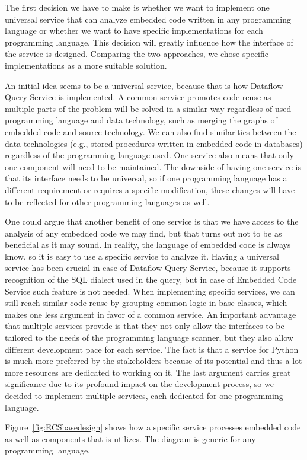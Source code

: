The first decision we have to make is whether we want to implement one universal service that can analyze embedded code written in any programming language or whether we want to have specific implementations for each programming language. This decision will greatly influence how the interface of the service is designed. Comparing the two approaches, we chose specific implementations as a more suitable solution.
\par
An initial idea seems to be a universal service, because that is how Dataflow Query Service is implemented. A common service promotes code reuse as multiple parts of the problem will be solved in a similar way regardless of used programming language and data technology, such as merging the graphs of embedded code and source technology. We can also find similarities between the data technologies (e.g., stored procedures written in embedded code in databases) regardless of the programming language used. One service also means that only one component will need to be maintained. The downside of having one service is that its interface needs to be universal, so if one programming language has a different requirement or requires a specific modification, these changes will have to be reflected for other programming languages as well.
\par
One could argue that another benefit of one service is that we have access to the analysis of any embedded code we may find, but that turns out not to be as beneficial as it may sound. In reality, the language of embedded code is always know, so it is easy to use a specific service to analyze it. Having a universal service has been crucial in case of Dataflow Query Service, because it supports recognition of the SQL dialect used in the query, but in case of Embedded Code Service such feature is not needed. When implementing specific services, we can still reach similar code reuse by grouping common logic in base classes, which makes one less argument in favor of a common service. An important advantage that multiple services provide is that they not only allow the interfaces to be tailored to the needs of the programming language scanner, but they also allow different development pace for each service. The fact is that a service for Python is much more preferred by the stakeholders because of its potential and thus a lot more resources are dedicated to working on it. The last argument carries great significance due to its profound impact on the development process, so we decided to implement multiple services, each dedicated for one programming language.
\par
Figure~\ref{fig:ECSbasedesign} shows how a specific service processes embedded code as well as components that is utilizes. The diagram is generic for any programming language.

